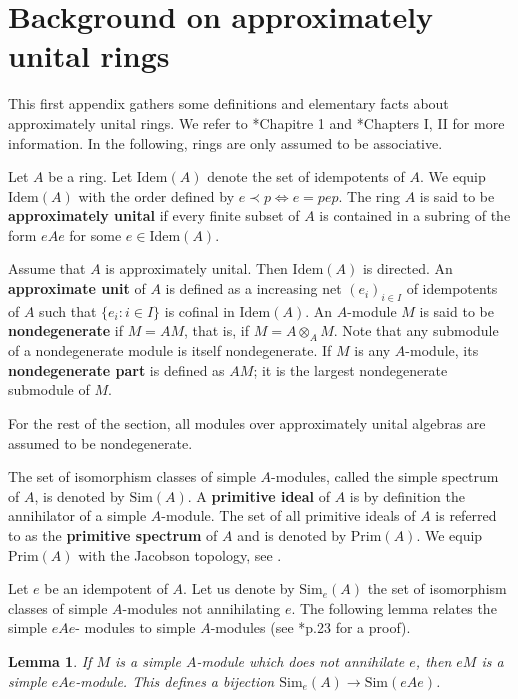 \documentclass{amsart}
\newtheorem{lemma}[theorem]{Lemma}
\theoremstyle{definition}
\begin{document}
\appendix

\section{Background on approximately unital rings}\label{AUA}
This first appendix gathers some definitions and elementary facts about approximately unital rings. We refer to \cite{Renard}*{Chapitre 1} and \cite{KnappVogan}*{Chapters I, II} for more information. In the following, rings are only assumed to be associative.

Let $A$ be a ring. Let $\mathrm{Idem}(A)$ denote the set of idempotents of $A$. We equip $\mathrm{Idem}(A)$ with the order defined by $e \prec p \Leftrightarrow e = pep$. The ring $A$ is said to be \textbf{approximately unital} if every finite subset of $A$ is contained in a subring of the form $eAe$ for some $e \in \mathrm{Idem}(A)$.

Assume that $A$ is approximately unital. Then $\mathrm{Idem}(A)$ is directed. An \textbf{approximate unit} of $A$ is defined as a increasing net $(e_i)_{i \in I}$ of idempotents of $A$ such that $\{e_i : i \in I\}$ is cofinal in $\mathrm{Idem}(A)$. An $A$-module $M$ is said to be \textbf{nondegenerate} if $M = AM$, that is, if $M = A \otimes_AM$. Note that any submodule of a nondegenerate module is itself nondegenerate. If $M$ is any $A$-module, its \textbf{nondegenerate part} is defined as $AM$; it is the largest nondegenerate submodule of $M$.

For the rest of the section, all modules over approximately unital algebras are assumed to be nondegenerate.

The set of isomorphism classes of simple $A$-modules, called the simple spectrum of $A$, is denoted by $\mathrm{Sim}(A)$. A \textbf{primitive ideal} of $A$ is by definition the annihilator of a simple $A$-module. The set of all primitive ideals of $A$ is referred to as the \textbf{primitive spectrum} of $A$ and is denoted by $\mathrm{Prim}(A)$. We equip $\mathrm{Prim}(A)$ with the Jacobson topology, see \cite{Jacobson}.

Let $e$ be an idempotent of $A$. Let us denote by $\mathrm{Sim}_e(A)$ the set of isomorphism classes of simple $A$-modules not annihilating $e$. The following lemma relates the simple $eAe$- modules to simple $A$-modules (see \cite{Renard}*{p.23} for a proof).

\begin{lemma}\label{TransferSimple}
    If $M$ is a simple $A$-module which does not annihilate $e$, then $eM$ is a simple $eAe$-module. This defines a bijection $\mathrm{Sim}_e(A) \to \mathrm{Sim}(eAe)$.
\end{lemma}
\end{document}
